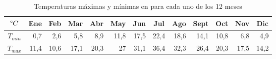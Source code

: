 \begin{table}[H]
\centering
\begin{tabular}{|c|r|r|r|r|r|r|r|r|r|r|r|r|}
\hline
$\degree C$ &
  \multicolumn{1}{c|}{Ene} &
  \multicolumn{1}{c|}{Feb} &
  \multicolumn{1}{c|}{Mar} &
  \multicolumn{1}{c|}{Abr} &
  \multicolumn{1}{c|}{May} &
  \multicolumn{1}{c|}{Jun} &
  \multicolumn{1}{c|}{Jul} &
  \multicolumn{1}{c|}{Ago} &
  \multicolumn{1}{c|}{Sept} &
  \multicolumn{1}{c|}{Oct} &
  \multicolumn{1}{c|}{Nov} &
  \multicolumn{1}{c|}{Dic} \\ \hline
$T_{min}$ & 0,7 & 2,6 & 5,8 & 8,9 & 11,8 & 17,5 & 22,4 & 18,6 & 14,1 & 10,8 & 6,8 & 4,9 \\ \hline
$T_{max}$ & 11,4 & 10,6 & 17,1 & 20,3 & 27 & 31,1 & 36,4 & 32,3 & 26,4 & 20,3 & 17,5 & 14,2 \\ \hline
\end{tabular}
\caption{Temperaturas máximas y mínimas en para cada uno de los 12 meses \label{tab:temp_min_max}}
\end{table}

